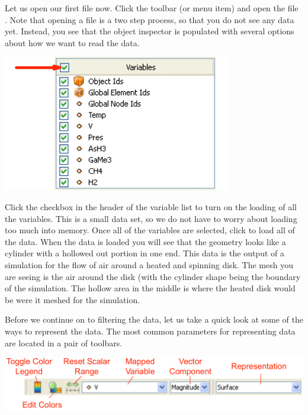 Let us open our first file now.  Click the  toolbar (or menu item) and
open the file .  Note that opening a file is a two step
process, so that you do not see any data yet.  Instead, you see that the
object inspector is populated with several options about how we want to
read the data.

\begin{inlinefig}
  \includegraphics{images/Variables_disk_out_ref}
\end{inlinefig}

Click the checkbox in the header of the variable list to turn on the
loading of all the variables.  This is a small data set, so we do not have
to worry about loading too much into memory.  Once all of the variables are
selected, click \apply to load all of the data.  When the data is loaded you
will see that the geometry looks like a cylinder with a hollowed out
portion in one end.  This data is the output of a simulation for the flow
of air around a heated and spinning disk.  The mesh you are seeing is the
air around the disk (with the cylinder shape being the boundary of the
simulation.  The hollow area in the middle is where the heated disk would
be were it meshed for the simulation.

Before we continue on to filtering the data, let us take a quick look at
some of the ways to represent the data.  The most common parameters for
representing data are located in a pair of toolbars.

\begin{inlinefig}
  \includegraphics[width=\linewidth]{images/DataRepresentationToolbars}
\end{inlinefig}

